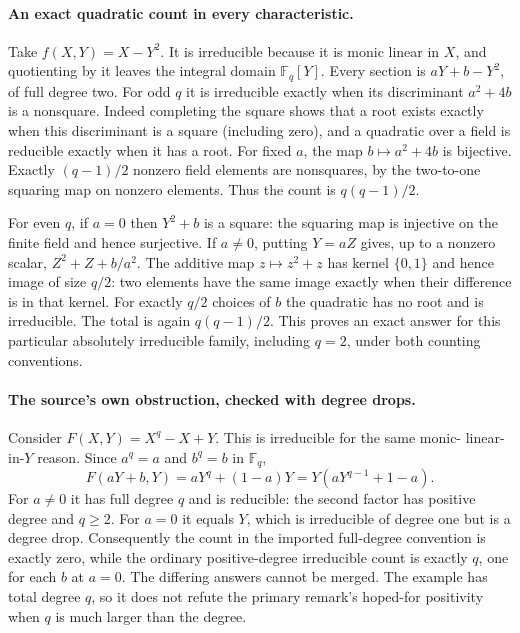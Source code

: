 \documentclass[11pt]{article}
\begin{document}
\paragraph{An exact quadratic count in every characteristic.}
Take $f(X,Y)=X-Y^2$. It is irreducible because it is monic linear in
$X$, and quotienting by it leaves the integral domain $\mathbb F_q[Y]$.
Every section is $aY+b-Y^2$, of full degree two. For odd $q$ it is
irreducible exactly when its discriminant $a^2+4b$ is a nonsquare.
Indeed completing the square shows that a root exists exactly when
this discriminant is a square (including zero), and a quadratic over
a field is reducible exactly when it has a root. For fixed $a$, the
map $b\mapsto a^2+4b$ is bijective. Exactly $(q-1)/2$ nonzero field
elements are nonsquares, by the two-to-one squaring map on nonzero
elements. Thus the count is $q(q-1)/2$.

For even $q$, if $a=0$ then $Y^2+b$ is a square: the squaring map
is injective on the finite field and hence surjective. If $a\ne0$,
putting $Y=aZ$ gives, up to a nonzero scalar,
$Z^2+Z+b/a^2$. The additive map $z\mapsto z^2+z$ has kernel
$\{0,1\}$ and hence image of size $q/2$: two elements have the
same image exactly when their difference is in that kernel. For
exactly $q/2$ choices of $b$ the quadratic has no root and is
irreducible. The total is again $q(q-1)/2$. This proves an exact
answer for this particular absolutely irreducible family, including
$q=2$, under both counting conventions.

\paragraph{The source's own obstruction, checked with degree drops.}
Consider $F(X,Y)=X^q-X+Y$. This is irreducible for the same monic-
linear-in-$Y$ reason. Since $a^q=a$ and $b^q=b$ in $\mathbb F_q$,
\[
F(aY+b,Y)=aY^q+(1-a)Y
        =Y(aY^{q-1}+1-a).
\]
For $a\ne0$ it has full degree $q$ and is reducible: the second
factor has positive degree and $q\ge2$. For $a=0$ it equals $Y$,
which is irreducible of degree one but is a degree drop. Consequently
the count in the imported full-degree convention is exactly zero,
while the ordinary positive-degree irreducible count is exactly $q$,
one for each $b$ at $a=0$. The differing answers cannot be merged.
The example has total degree $q$, so it does not refute the primary
remark's hoped-for positivity when $q$ is much larger than the degree.
\end{document}

